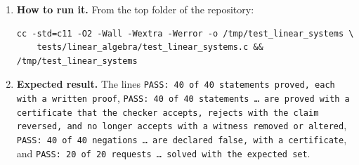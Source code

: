 \documentclass[11pt,a4paper]{article}
\begin{document}
\begin{enumerate}
\item \textbf{How to run it.} From the top folder of the repository:
\begin{verbatim}
cc -std=c11 -O2 -Wall -Wextra -Werror -o /tmp/test_linear_systems \
    tests/linear_algebra/test_linear_systems.c && /tmp/test_linear_systems
\end{verbatim}

\item \textbf{Expected result.} The lines \texttt{PASS: 40 of 40 statements proved, each with a written proof}, \texttt{PASS: 40 of 40 statements \dots{} are proved with a certificate that the checker accepts, rejects with the claim reversed, and no longer accepts with a witness removed or altered}, \texttt{PASS: 40 of 40 negations \dots{} are declared false, with a certificate}, and \texttt{PASS: 20 of 20 requests \dots{} solved with the expected set}.
\end{enumerate}
\end{document}
